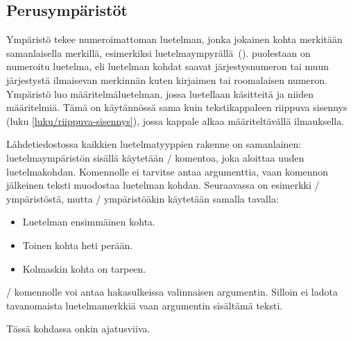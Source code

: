 \subsection{Perusympäristöt}
\label{luku/luetelma-perus}

Ympäristö  tekee numeroimattoman luetelman, jonka
jokainen kohta merkitään samanlaisella merkillä, esimerkiksi
luetelmaympyrällä~(\textbullet).  puolestaan on
numeroitu luetelma, eli luetelman kohdat saavat järjestysnumeron tai
muun järjestystä ilmaisevan merkinnän kuten kirjaimen tai roomalaisen
numeron. Ympäristö  luo määritelmäluetelman,
jossa luetellaan käsitteitä ja niiden määritelmiä. Tämä on käytännössä
sama kuin tekstikappaleen riippuva sisennys (luku
\ref{luku/riippuva-sisennys}), jossa kappale alkaa määriteltävällä
ilmauksella.

Lähdetiedostossa kaikkien luetelmatyyppien rakenne on samanlainen:
luetelmaympäristön sisällä käytetään \-/ komentoa, joka
aloittaa uuden luetelmakohdan. Komennolle ei tarvitse antaa argumenttia,
vaan komennon jälkeinen teksti muodostaa luetelman kohdan. Seuraavassa
on esimerkki \-/ ympäristöstä, mutta
\-/ ympäristöäkin käytetään samalla tavalla:

\begin{koodilohkosis}
\begin{itemize}
\item Luetelman ensimmäinen kohta.
\item Toinen kohta heti perään.
\item Kolmaskin kohta on tarpeen.
\end{itemize}
\end{koodilohkosis}

\noindent
{}\-/ komennolle voi antaa hakasulkeissa valinnaisen
argumentin. Silloin ei ladota tavanomaista luetelmamerkkiä vaan
argumentin sisältämä teksti.

\begin{koodilohkosis}
\item[--] Tässä kohdassa onkin ajatusviiva.
\end{koodilohkosis}

